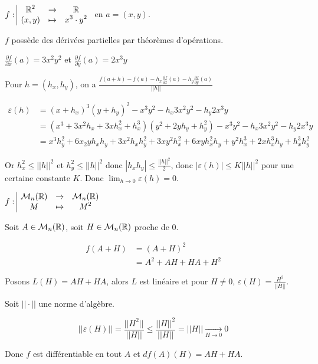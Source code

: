\begin{exemple}
    $f: \space \begin{array}{|ccc} \displaystyle \mathbb{R}^2 & \to & \displaystyle \mathbb{R} \\ \displaystyle (x, y) & \mapsto & \displaystyle x^3 \cdot y^2 \end{array}$ en $a = (x, y)$. 

    $f$ possède des dérivées partielles par théorèmes d'opérations. 

    $\displaystyle \frac{\partial f }{\partial x} (a) = 3 x^2 y^2$ et $\displaystyle \frac{\partial f }{\partial y} (a) = 2 x^3 y$

    Pour $h = (h_x, h_y)$, on a
    $\displaystyle \frac{f(a + h) - f(a) - h_x \frac{\partial f }{\partial x }(a) - h_y \frac{\partial f}{\partial y }(a)}{||h||}$

    \begin{align}
        \varepsilon(h) & = (x + h_x)^3 (y + h_y)^2 - x^3 y^2 - h_x 3 x^2 y^2 - h_y 2 x^3 y \\
        & = (x^3 + 3x^2 h_x + 3x h_x^2 + h_x^3)(y^2 + 2 y h_y + h_y^2) - x^3 y^2 - h_x 3 x^2 y^2 - h_y 2 x^3 y \\
        & = x^3 h_y^2 + 6x_2y h_x h_y + 3 x^2 h_x h_y^2 + 3 x y^2 h_x^2 + 6 x y h_x^2 h_y + y^2 h_x^3 + 2 x h_x^3 h_y + h_x^3 h_y^2
    \end{align}

    Or $h_x^2 \leqslant ||h||^2$ et $h_y^2 \leqslant ||h||^2$ donc
    $|h_xh_y| \leqslant \frac{||h||^2}{2}$, 
    donc $|\varepsilon(h)| \leqslant K ||h||^2$ pour une certaine constante $K$.
    Donc $\displaystyle \lim_{h \to 0 } \varepsilon (h) = 0$.
\end{exemple}

\begin{exemple}
    $f: \space \begin{array}{|ccc} \displaystyle \mathcal M_n(\mathbb{R}) & \to & \displaystyle \mathcal{M}_n(\mathbb{R}) \\ \displaystyle M & \mapsto & \displaystyle M^2 \end{array}$

    Soit $A \in \mathcal{M}_n(\mathbb{R})$, soit $H \in \mathcal M_n(\mathbb{R})$ proche de $0$.

    \begin{align}
        f(A + H) & = (A + H)^2 \\
        & = A^2 + AH + HA + H^2 
    \end{align}

    Posons $L(H) = AH + HA$, alors $L$ est linéaire et 
    pour $H \neq 0$, $\varepsilon (H) = \frac{H^2}{||H||}$.

    Soit $|| \cdot ||$ une norme d'algèbre. 

    $$||\varepsilon (H)|| = \frac{||H^2||}{||H||} \leqslant \frac{||H||^2}{||H||} = ||H|| \xrightarrow[H \to 0 ]{} 0$$

    Donc $f$ est différentiable en tout $A$ et $df(A)(H) = AH + HA$.
\end{exemple}

